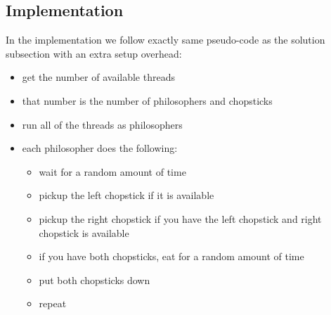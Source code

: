\documentclass[journal,10pt,onecolumn,compsoc,letterpaper,draftclsnofoot,table,xcdraw]{IEEEtran} \usepackage[margin=0.75in]{geometry}
\begin{document}
\subsection{Implementation}
\noindent In the implementation we follow exactly same pseudo-code as the solution subsection with an extra setup overhead:
\begin{itemize}
\item get the number of available threads
\item that number is the number of philosophers and chopsticks
\item run all of the threads as philosophers
\item each philosopher does the following:
	\begin{itemize}
	\item wait for a random amount of time
	\item pickup the left chopstick if it is available
	\item pickup the right chopstick if you have the left chopstick and right chopstick is available
	\item if you have both chopsticks, eat for a random amount of time
	\item put both chopsticks down
	\item repeat
	\end{itemize}
\end{itemize}
\end{document}
